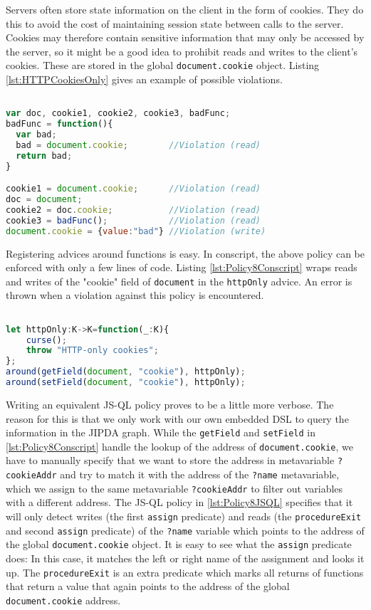 Servers often store state information on the client in the form of cookies. They do this to avoid the cost of maintaining session state between calls to the server. Cookies may therefore contain sensitive information that may only be accessed by the server, so it might be a good idea to prohibit reads and writes to the client's cookies. These are stored in the global \texttt{document.cookie} object. Listing \ref{lst:HTTPCookiesOnly} gives an example of possible violations.

\begin{lstlisting}[label={lst:HTTPCookiesOnly},language=JavaScript,caption=HTTP-cookies only example,mathescape=true]  % float=t?

var doc, cookie1, cookie2, cookie3, badFunc;
badFunc = function(){
  var bad;
  bad = document.cookie;        //Violation (read)
  return bad;
}

cookie1 = document.cookie;      //Violation (read)
doc = document;
cookie2 = doc.cookie;           //Violation (read)
cookie3 = badFunc();            //Violation (read)
document.cookie = {value:"bad"} //Violation (write)
\end{lstlisting}

Registering advices around functions is easy. In conscript, the above policy can be enforced with only a few lines of code. Listing \ref{lst:Policy8Conscript} wraps reads and writes of the "cookie" field of \texttt{document} in the \texttt{httpOnly} advice. An error is thrown when a violation against this policy is encountered.

\begin{lstlisting}[label={lst:Policy8Conscript},language=JavaScript,caption=Policy 8 in ConScript,mathescape=true]  % float=t?

let httpOnly:K->K=function(_:K){ 
    curse(); 
    throw "HTTP-only cookies"; 
};
around(getField(document, "cookie"), httpOnly); 
around(setField(document, "cookie"), httpOnly);
\end{lstlisting}

Writing an equivalent JS-QL policy proves to be a little more verbose. The reason for this is that we only work with our own embedded DSL to query the information in the JIPDA graph. While the \texttt{getField} and \texttt{setField} in \ref{lst:Policy8Conscript} handle the lookup of the address of \texttt{document.cookie}, we have to manually specify that we want to store the address in metavariable \texttt{?cookieAddr} and try to match it with the address of the \texttt{?name} metavariable, which we assign to the same metavariable \texttt{?cookieAddr} to filter out variables with a different address. The JS-QL policy in \ref{lst:Policy8JSQL} specifies that it will only detect writes (the first \texttt{assign} predicate) and reads (the \texttt{procedureExit} and second \texttt{assign} predicate) of the \texttt{?name} variable which points to the address of the global \texttt{document.cookie} object. It is easy to see what the \texttt{assign} predicate does: In this case, it matches the left or right name of the assignment and looks it up. The \texttt{procedureExit} is an extra predicate which marks all returns of functions that return a value that again points to the address of the global \texttt{document.cookie} address.



